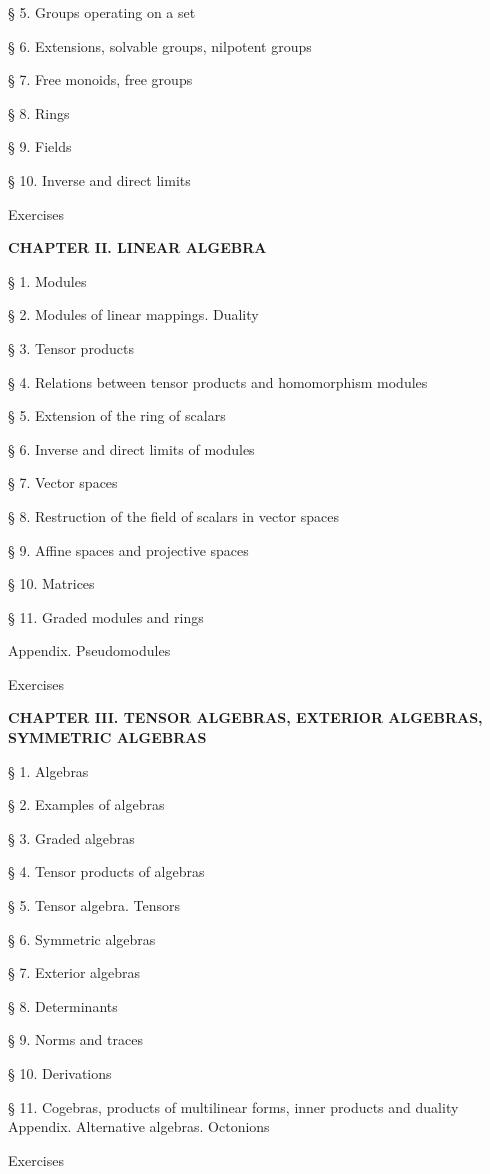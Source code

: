 § 5. Groups operating on a set

§ 6. Extensions, solvable groups, nilpotent groups

§ 7. Free monoids, free groups

§ 8. Rings

§ 9. Fields

§ 10. Inverse and direct limits

Exercises

\textbf{CHAPTER II. LINEAR ALGEBRA}

§ 1. Modules

§ 2. Modules of linear mappings. Duality

§ 3. Tensor products

§ 4. Relations between tensor products and homomorphism modules

§ 5. Extension of the ring of scalars

§ 6. Inverse and direct limits of modules

§ 7. Vector spaces

§ 8. Restruction of the field of scalars in vector spaces

§ 9. Affine spaces and projective spaces

§ 10. Matrices

§ 11. Graded modules and rings

Appendix. Pseudomodules

Exercises

\textbf{CHAPTER III. TENSOR ALGEBRAS, EXTERIOR ALGEBRAS, SYMMETRIC ALGEBRAS}

§ 1. Algebras

§ 2. Examples of algebras

§ 3. Graded algebras

§ 4. Tensor products of algebras

§ 5. Tensor algebra. Tensors

§ 6. Symmetric algebras

§ 7. Exterior algebras

§ 8. Determinants

§ 9. Norms and traces

§ 10. Derivations

§ 11. Cogebras, products of multilinear forms, inner products and duality Appendix. Alternative algebras. Octonions

Exercises
